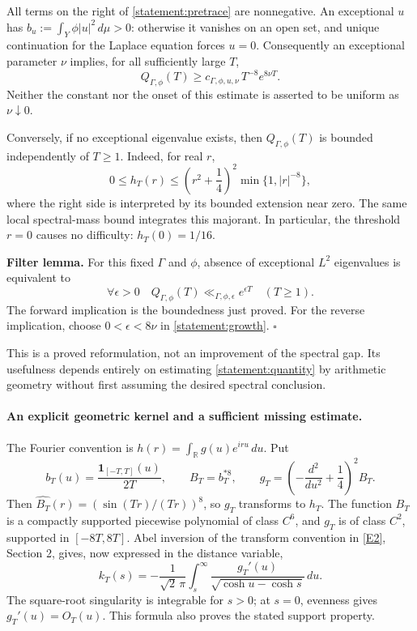\documentclass[11pt]{article}
\newcommand{\R}{\mathbb{R}}
\newcommand{\eref}[2]{\hyperlink{extra:#1:#2}{[E#2]}}
\begin{document}
All terms on the right of \eqref{statement:pretrace} are nonnegative. An exceptional
$u$ has
$b_u:=\int_Y\phi|u|^2\,d\mu>0$: otherwise it vanishes on an open set, and
unique continuation for the Laplace equation forces $u=0$. Consequently an
exceptional parameter $\nu$ implies, for all sufficiently large $T$,
\begin{equation}\label{statement:growth}
 Q_{\Gamma,\phi}(T)\ge
       c_{\Gamma,\phi,u,\nu}\,T^{-8}e^{8\nu T}.
\end{equation}
Neither the constant nor the onset of this estimate is asserted to be uniform
as $\nu\downarrow0$.

Conversely, if no exceptional eigenvalue exists, then $Q_{\Gamma,\phi}(T)$
is bounded independently of $T\ge1$. Indeed, for real $r$,
\[
 0\le h_T(r)\le
 \left(r^2+\frac14\right)^2\min\{1,|r|^{-8}\},
\]
where the right side is interpreted by its bounded extension near zero.
The same local spectral-mass bound integrates this majorant. In particular,
the threshold $r=0$ causes no difficulty: $h_T(0)=1/16$.

\textbf{Filter lemma.} For this fixed $\Gamma$ and $\phi$, absence of
exceptional $L^2$ eigenvalues is equivalent to
\begin{equation}\label{statement:subexp}
 \forall\epsilon>0\quad
 Q_{\Gamma,\phi}(T)\ll_{\Gamma,\phi,\epsilon}e^{\epsilon T}
 \quad(T\ge1).
\end{equation}
The forward implication is the boundedness just proved. For the reverse
implication, choose $0<\epsilon<8\nu$ in \eqref{statement:growth}.
\hfill$\square$

This is a proved reformulation, not an improvement of the spectral gap.
Its usefulness depends entirely on estimating \eqref{statement:quantity} by
arithmetic geometry without first assuming the desired spectral conclusion.

\paragraph{An explicit geometric kernel and a sufficient missing estimate.}
The Fourier convention is $h(r)=\int_{\R}g(u)e^{iru}\,du$. Put
\[
 b_T(u)=\frac{\mathbf 1_{[-T,T]}(u)}{2T},\qquad
 B_T=b_T^{*8},\qquad
 g_T=\left(-\frac{d^2}{du^2}+\frac14\right)^2B_T.
\]
Then $\widehat{B_T}(r)=(\sin(Tr)/(Tr))^8$, so $g_T$ transforms to $h_T$.
The function $B_T$ is a compactly supported piecewise polynomial of class
$C^6$, and $g_T$ is of class $C^2$, supported in $[-8T,8T]$.
Abel inversion of the transform convention in \eref{statement}{2}, Section 2,
gives, now expressed in the distance variable,
\begin{equation}\label{statement:inverse}
 k_T(s)=-\frac1{\sqrt2\,\pi}
       \int_s^\infty\frac{g_T'(u)}{\sqrt{\cosh u-\cosh s}}\,du.
\end{equation}
The square-root singularity is integrable for $s>0$; at $s=0$, evenness gives
$g_T'(u)=O_T(u)$. This formula also proves the stated support property.
\end{document}
